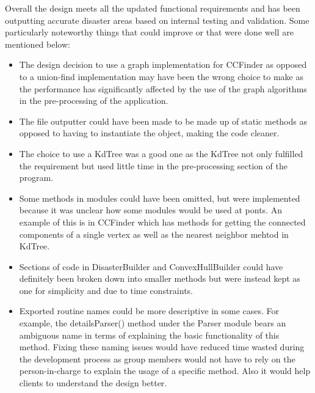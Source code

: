 \documentclass[12pt]{article}
\begin{document}
Overall the design meets all the updated functional requirements and has been outputting accurate disaster areas based on internal testing and validation. Some particularly noteworthy things that could improve or that were done well are mentioned below:
\begin{itemize}
\item The design decision to use a graph implementation for CCFinder as opposed to a union-find implementation may have been the wrong choice to make as the performance has significantly affected by the use of the graph algorithms in the pre-processing of the application.
\item The file outputter could have been made to be made up of static methods as opposed to having to instantiate the object, making the code cleaner.
\item The choice to use a KdTree was a good one as the KdTree not only fulfilled the requirement but used little time in the pre-processing section of the program.
\item Some methods in modules could have been omitted, but were implemented because it was unclear how some modules would be used at ponts. An example of this is in CCFinder which has methods for getting the connected components of a single vertex as well as the nearest neighbor mehtod in KdTree.
\item Sections of code in DisasterBuilder and ConvexHullBuilder could have definitely been broken down into smaller methods but were instead kept as one for simplicity and due to time constraints.
\item Exported routine names could be more descriptive in some cases. For example, the detailsParser() method under the Parser module bears an ambiguous name in terms of explaining the basic functionality of this method. Fixing these naming issues would have reduced time wasted during the development process as group members would not have to rely on the person-in-charge to explain the usage of a specific method. Also it would help clients to understand the design better.
\end{itemize}
\end{document}
